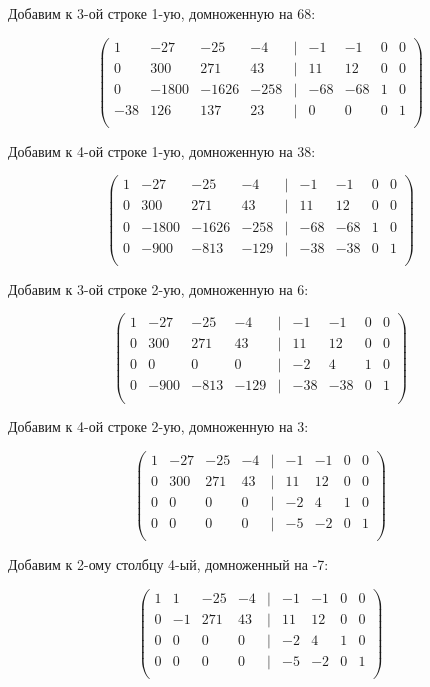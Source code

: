 	Добавим к 3-ой строке 1-ую, домноженную на 68:
	
	\[
	\begin{pmatrix}
	1 & -27 & -25 & -4 & | & -1 & -1 & 0 & 0 \\
	0 & 300 & 271 & 43 & | & 11 & 12 & 0 & 0 \\
	0 & -1800 & -1626 & -258 & | & -68 & -68 & 1 & 0 \\
	-38 & 126 & 137 & 23 & | & 0 & 0 & 0 & 1 \\
	\end{pmatrix}
	\]
	
	Добавим к 4-ой строке 1-ую, домноженную на 38:
	
	\[
	\begin{pmatrix}
	1 & -27 & -25 & -4 & | & -1 & -1 & 0 & 0 \\
	0 & 300 & 271 & 43 & | & 11 & 12 & 0 & 0 \\
	0 & -1800 & -1626 & -258 & | & -68 & -68 & 1 & 0 \\
	0 & -900 & -813 & -129 & | & -38 & -38 & 0 & 1 \\
	\end{pmatrix}
	\]
	
	Добавим к 3-ой строке 2-ую, домноженную на 6:
	
	\[
	\begin{pmatrix}
	1 & -27 & -25 & -4 & | & -1 & -1 & 0 & 0 \\
	0 & 300 & 271 & 43 & | & 11 & 12 & 0 & 0 \\
	0 & 0 & 0 & 0 & | & -2 & 4 & 1 & 0 \\
	0 & -900 & -813 & -129 & | & -38 & -38 & 0 & 1 \\
	\end{pmatrix}
	\]
	
	Добавим к 4-ой строке 2-ую, домноженную на 3:
	
	\[
	\begin{pmatrix}
	1 & -27 & -25 & -4 & | & -1 & -1 & 0 & 0 \\
	0 & 300 & 271 & 43 & | & 11 & 12 & 0 & 0 \\
	0 & 0 & 0 & 0 & | & -2 & 4 & 1 & 0 \\
	0 & 0 & 0 & 0 & | & -5 & -2 & 0 & 1 \\
	\end{pmatrix}
	\]
	
	Добавим к 2-ому столбцу 4-ый, домноженный на -7:
	
	\[
	\begin{pmatrix}
	1 & 1 & -25 & -4 & | & -1 & -1 & 0 & 0 \\
	0 & -1 & 271 & 43 & | & 11 & 12 & 0 & 0 \\
	0 & 0 & 0 & 0 & | & -2 & 4 & 1 & 0 \\
	0 & 0 & 0 & 0 & | & -5 & -2 & 0 & 1 \\
	\end{pmatrix}
	\]
	
